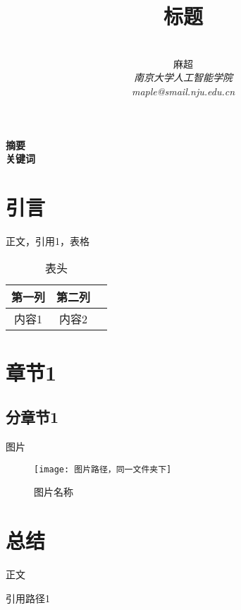 \documentclass[12pt,a4paper]{ctexart}
\title{\textbf{标题}}
\author{
\\
\Large{麻超 \quad 201300066}
\\[6pt]
{ \large \textit{南京大学人工智能学院}}\\[2pt]\large \textit{maple@smail.nju.edu.cn}
}
\date{}
\newcommand{\supercite}[1]{\textsuperscript{\cite{#1}}}
\begin{document}
\maketitle
\setcounter{page}{1}
\textbf{摘要}  \\

\textbf{关键词}
\\[60pt]
\section{引言}
正文，引用1\supercite{1}，表格
\begin{table}[ht]
    \centering
    \caption{表头}\label{}
    \tabcolsep 15pt
    \begin{tabular}{c|c|c}
        \hline
        第一列 & 第二列 \\
        \hline
        内容1  & 内容2
        \hline
    \end{tabular}
\end{table}


\section{章节1}
\subsection{分章节1}
图片
\begin{figure}[H]
    \centering
    \texttt{[image: 图片路径，同一文件夹下]}
    \caption{图片名称}
\end{figure}
\section{总结}
正文

\newpage
\small

\begin{thebibliography}{99}
    \setlength{\parskip}{0pt}

     引用路径1


\end{thebibliography}
\end{document}
